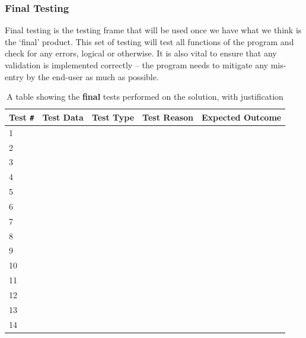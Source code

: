 \documentclass[9pt]{article}
\begin{document}
\newpage
\subsubsection{Final Testing}
Final testing is the testing frame that will be used once we have what we think is the `final' product. This set of testing will test all functions of the program and check for any errors, logical or otherwise. It is also vital to ensure that any validation is implemented correctly -- the program needs to mitigate any mis-entry by the end-user as much as possible.
\begin{table}[H]
	\centering
	\begin{tabularx}{\textwidth}{lXlXX}
		\textbf{Test} \verb|#| & \textbf{Test Data}            & \textbf{Test Type} & \textbf{Test Reason}           & \textbf{Expected Outcome}      \\ \midrule
		1   &  &  &  & \\
		2   &  &  &  & \\
		3   &  &  &  & \\
		4   &  &  &  & \\
		5   &  &  &  & \\
		6   &  &  &  & \\
		7   &  &  &  & \\
		8   &  &  &  & \\
		9   &  &  &  & \\
		10  &  &  &  & \\
		11  &  &  &  & \\
		12  &  &  &  & \\
		13  &  &  &  & \\
		14  &  &  &  & \\ \bottomrule
	\end{tabularx}
	\caption{A table showing the \textbf{final} tests performed on the solution, with justification}
	\label{tab_testingDesignSolutionFinal}
\end{table}














\newpage
\end{document}
